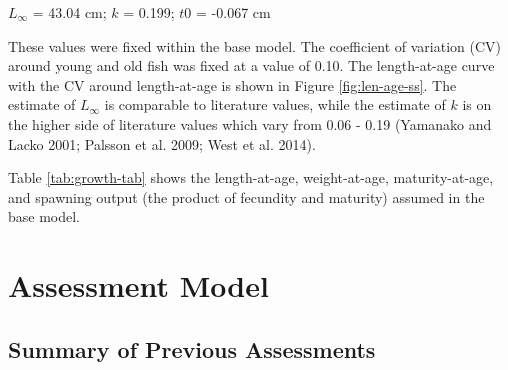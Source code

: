 \documentclass[11pt,
  english,
  letterpaper,
]{article}
\begin{document}
\leavevmode\tagmcend\tagstructend\par

\begin{centering}

$L_{\infty}$ = 43.04 cm; $k$ = 0.199; $t0$ = -0.067 cm  

\end{centering}


These values were fixed within the base model. The coefficient of variation (CV) around young and old fish was fixed at a value of 0.10. The length-at-age curve with the CV around length-at-age is shown in Figure \ref{fig:len-age-ss}. The estimate of {\(L_{\infty}\)\leavevmode\tagmcend\tagstructend} is comparable to literature values, while the estimate of {\(k\)\leavevmode\tagmcend\tagstructend} is on the higher side of literature values which vary from 0.06 - 0.19 {(Yamanako and Lacko 2001; Palsson et al. 2009; West et al. 2014)\leavevmode\tagmcend\tagstructend}.

\leavevmode\tagmcend\tagstructend\par


Table \ref{tab:growth-tab} shows the length-at-age, weight-at-age, maturity-at-age, and spawning output (the product of fecundity and maturity) assumed in the base model.

\leavevmode\tagmcend\tagstructend\par


\hypertarget{assessment-model}{%
\section{Assessment Model}\label{assessment-model}}

\leavevmode\tagmcend\tagstructend


\hypertarget{summary-of-previous-assessments}{%
\subsection{Summary of Previous Assessments}\label{summary-of-previous-assessments}}
\end{document}
